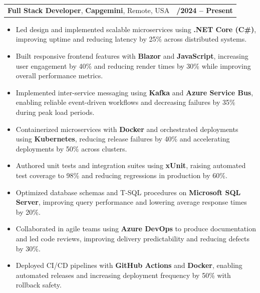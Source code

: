 \documentclass[letterpaper,11pt]{article}
\makeatletter
\newcommand{\resumeItem}[1]{
  \item\footnotesize{
    {#1 \vspace{-2pt}}
  }
}
\newcommand{\resumeSubheading}[4]{
  \vspace{-2pt}\item
    \begin{tabular*}{1.0\textwidth}[t]{l@{\extracolsep{\fill}}r}
      \textbf{\fontsize{10pt}{14pt}\selectfont #3}, \textbf{\fontsize{10pt}{14pt}\selectfont #1}, \fontsize{10pt}{14pt}\selectfont #4 & \textbf{\fontsize{10pt}{14pt}\selectfont #2} \\
    \end{tabular*}\vspace{-7pt}
}
\newcommand{\resumeItemListStart}{\begin{itemize}[leftmargin=*]}
\newcommand{\resumeItemListEnd}{\end{itemize}\vspace{-5pt}}
\makeatother
\begin{document}
    \resumeSubheading
        {Capgemini}{01/2024 -- Present}
        {Full Stack Developer}{Remote, USA}
      \resumeItemListStart
        \resumeItem{Led design and implemented scalable microservices using \textbf{.NET Core (C\#)}, improving uptime and reducing latency by 25\% across distributed systems.}
        \resumeItem{Built responsive frontend features with \textbf{Blazor} and \textbf{JavaScript}, increasing user engagement by 40\% and reducing render times by 30\% while improving overall performance metrics.}
        \resumeItem{Implemented inter-service messaging using \textbf{Kafka} and \textbf{Azure Service Bus}, enabling reliable event-driven workflows and decreasing failures by 35\% during peak load periods.}
        \resumeItem{Containerized microservices with \textbf{Docker} and orchestrated deployments using \textbf{Kubernetes}, reducing release failures by 40\% and accelerating deployments by 50\% across clusters.}
        \resumeItem{Authored unit tests and integration suites using \textbf{xUnit}, raising automated test coverage to 98\% and reducing regressions in production by 60\%.}
        \resumeItem{Optimized database schemas and T-SQL procedures on \textbf{Microsoft SQL Server}, improving query performance and lowering average response times by 20\%.}
        \resumeItem{Collaborated in agile teams using \textbf{Azure DevOps} to produce documentation and led code reviews, improving delivery predictability and reducing defects by 30\%.}
        \resumeItem{Deployed CI/CD pipelines with \textbf{GitHub Actions} and \textbf{Docker}, enabling automated releases and increasing deployment frequency by 50\% with rollback safety.}
      \resumeItemListEnd
\end{document}
